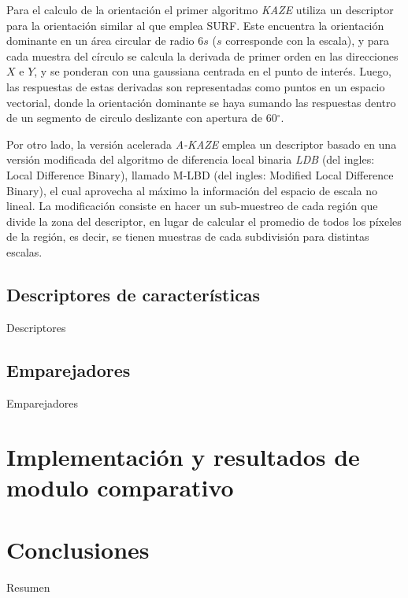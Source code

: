 Para el calculo de la orientación el primer algoritmo \textit{KAZE} utiliza un descriptor para la orientación similar al que emplea SURF. Este encuentra la orientación dominante en un área circular de radio 6$s$ ($s$ corresponde con la escala), y para cada muestra del círculo se calcula la derivada de primer orden en las direcciones $X$ e $Y$, y se ponderan con una gaussiana centrada en el punto de interés. Luego, las respuestas de estas derivadas son representadas como puntos en un espacio vectorial, donde la orientación dominante se haya sumando las respuestas dentro de un segmento de circulo deslizante con apertura de 60$^\circ$.

Por otro lado, la versión acelerada \textit{A-KAZE} emplea un descriptor basado en una versión modificada del algoritmo de diferencia local binaria \textit{LDB} \cite{ldb} (del ingles: Local Difference Binary), llamado M-LBD (del ingles: Modified Local Difference Binary), el cual aprovecha al máximo la información del espacio de escala no lineal. La modificación consiste en hacer un sub-muestreo de cada región que divide la zona del descriptor, en lugar de calcular el promedio de todos los píxeles de la región, es decir, se tienen muestras de cada subdivisión para distintas escalas.


\subsection{Descriptores de características}

Descriptores

\subsection{Emparejadores}

Emparejadores

\section{Implementación y resultados de modulo comparativo}

\section{Conclusiones}

Resumen